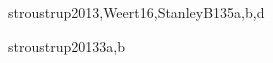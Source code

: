 \begin{syllabus}
\begin{unit}{\SDFAlgorithmsandDesign}{}{stroustrup2013,Weert16,StanleyB13}{5}{a,b,d}
\begin{learningoutcomes}
	\item \SDFAlgorithmsandDesignLODiscussTheAlgorithms [\Usage]
	\item \SDFAlgorithmsandDesignLODiscussHowMay [\Usage]
	\item \SDFAlgorithmsandDesignLOCreateAlgorithms [\Usage]
	\item \SDFAlgorithmsandDesignLOUseAToAnd [\Usage]
	\item \SDFAlgorithmsandDesignLOImplementTest [\Usage]
	\item \SDFAlgorithmsandDesignLODetermineWhetherOr [\Usage]
	\item \SDFAlgorithmsandDesignLOImplementAConquer [\Usage]
	\item \SDFAlgorithmsandDesignLOApplyTheDecomposition [\Usage]
	\item \SDFAlgorithmsandDesignLOIdentifyTheAnd [\Usage]
	\item \SDFAlgorithmsandDesignLOImplementAData [\Usage]
	\item \SDFAlgorithmsandDesignLOIdentifyTheAndMultiple [\Usage]
\end{learningoutcomes}
\end{unit}

\begin{unit}{\ALBasicAnalysis}{}{stroustrup2013}{3}{a,b}
\begin{topics}
	\item \ALBasicAnalysisTopicDifferences
	\item \ALBasicAnalysisTopicAsymptotic
	\item \ALBasicAnalysisTopicBig
	\item \ALBasicAnalysisTopicComplexity
	\item \ALBasicAnalysisTopicEmpirical
	\item \ALBasicAnalysisTopicTime
	\item \ALBasicAnalysisTopicBigO
	\item \ALBasicAnalysisTopicLittle
	\item \ALBasicAnalysisTopicRecurrence
	\item \ALBasicAnalysisTopicAnalysis
	\item \ALBasicAnalysisTopicSome
\end{topics}


\end{unit}
\end{syllabus}
